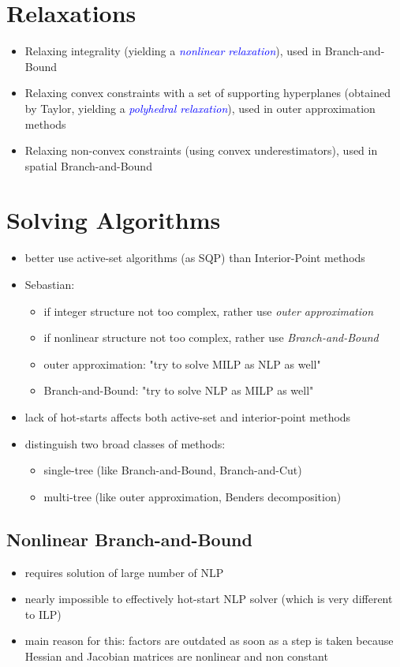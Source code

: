 \documentclass{article}
\begin{document}
\section{Relaxations}
\begin{itemize}
\item Relaxing integrality (yielding a \textcolor{blue}{\textit{nonlinear relaxation}}), used in Branch-and-Bound
\item Relaxing convex constraints with a set of supporting hyperplanes (obtained by Taylor, yielding a \textcolor{blue}{\textit{polyhedral relaxation}}), used in outer approximation methods
\item Relaxing non-convex constraints (using convex underestimators), used in spatial Branch-and-Bound
\end{itemize}

\section{Solving Algorithms}
\begin{itemize}
\item better use active-set algorithms (as SQP) than Interior-Point methods
\item Sebastian: 
\begin{itemize}
\item if integer structure not too complex, rather use \textit{outer approximation}
\item if nonlinear structure not too complex, rather use \textit{Branch-and-Bound}
\item outer approximation: "try to solve MILP as NLP as well"
\item Branch-and-Bound: "try to solve NLP as MILP as well"
\end{itemize}
\item lack of hot-starts affects both active-set and interior-point methods
\item distinguish two broad classes of methods: 
\begin{itemize}
\item single-tree (like Branch-and-Bound, Branch-and-Cut) 
\item multi-tree (like outer approximation, Benders decomposition)
\end{itemize}

\end{itemize}


\subsection{Nonlinear Branch-and-Bound}
\begin{itemize}
\item requires solution of large number of NLP
\item nearly impossible to effectively hot-start NLP solver (which is very different to ILP)
\item main reason for this: factors are outdated as soon as a step is taken because Hessian and Jacobian matrices are nonlinear and non constant
\end{itemize}
\end{document}
